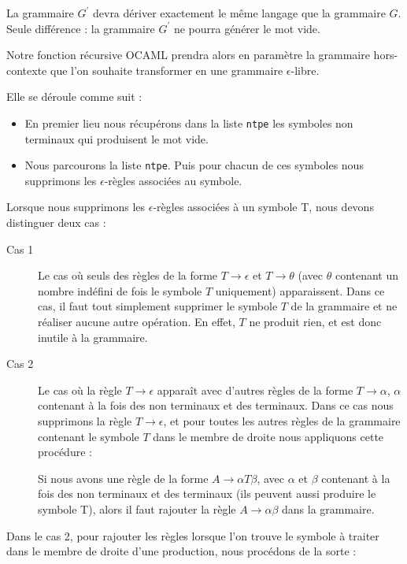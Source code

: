 \documentclass[11pt,a4paper]{article}
\def\code#1{\texttt{#1}} %
\begin{document}
La grammaire $G^\prime$ devra dériver exactement le même
langage que la grammaire $G$. Seule différence : la grammaire
$G^\prime$ ne pourra générer le mot vide.
\newline

Notre fonction récursive OCAML prendra alors en paramètre
la grammaire hors-contexte que l'on souhaite transformer
en une grammaire $\epsilon$-libre.

Elle se déroule comme suit :

\begin{itemize}
    \item En premier lieu nous récupérons dans la liste \code{ntpe}
    les symboles non terminaux qui produisent le mot vide.
    \item Nous parcourons la liste \code{ntpe}. Puis pour chacun de
    ces symboles nous supprimons les $\epsilon$-règles associées au symbole.
\end{itemize}

Lorsque nous supprimons les $\epsilon$-règles associées à un
symbole T, nous devons distinguer deux cas :
\begin{description}
    \item[Cas 1] Le cas où seuls des règles de la forme
        $T \rightarrow \epsilon$ et $T \rightarrow \theta$
        (avec $\theta$ contenant un nombre indéfini de
        fois le symbole $T$ uniquement) apparaissent. Dans ce cas, il faut
        tout simplement supprimer le symbole $T$ de la grammaire et ne réaliser
        aucune autre opération. En effet, $T$ ne produit rien, et est
        donc inutile à la grammaire.
    \item[Cas 2] Le cas où la règle $T \rightarrow \epsilon$ apparaît avec d'autres
        règles de la forme $T \rightarrow \alpha$, $\alpha$ contenant
        à la fois des non terminaux et des terminaux. Dans ce cas nous supprimons
        la règle $T \rightarrow \epsilon$, et pour toutes les autres règles de la grammaire
        contenant le symbole $T$ dans le membre de droite nous appliquons cette
        procédure :

        Si nous avons une règle de la forme $A \rightarrow \alpha T \beta$,
        avec $\alpha$ et $\beta$ contenant à la fois des non terminaux et des terminaux
        (ils peuvent aussi produire le symbole T), alors il faut rajouter la règle
        $A \rightarrow \alpha \beta$ dans la grammaire.
\end{description}

Dans le cas 2, pour rajouter les règles lorsque l'on trouve le symbole à traiter dans
le membre de droite d'une production, nous procédons de la sorte :
\end{document}
